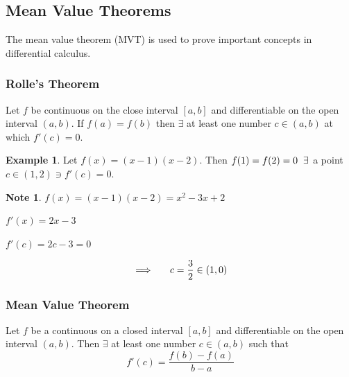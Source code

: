 \documentclass[11pt,a4paper]{article}
\theoremstyle{definition}
\newtheorem{exa}[thm]{Example}
\newtheorem*{note}{Note}
\begin{document}
\pagebreak
\subsection{Mean Value Theorems}
The mean value theorem (MVT) is used to prove important concepts in differential calculus.


\subsubsection{Rolle's Theorem}
Let $f$ be continuous on the close interval $[a,b]$ and differentiable on the open interval $(a,b)$. If $f(a) = f(b)$ then $\exists$ at least one number $c \in (a,b)$ at which $f'(c) = 0$.


\begin{figure}[H]
\centering
{}
\end{figure}

\begin{exa}


Let $f(x) = (x - 1)(x - 2)$. Then $f(1) = f(2) = 0 \hspace{0.2cm}\exists $ a point $c\in (1,2)\ni f'(c) = 0$.


\begin{note}
$f(x) = (x - 1) (x - 2) = x^2 - 3x + 2$
\end{note}


$f'(x)  = 2x - 3$


$f'(c)  = 2c - 3 = 0$

$$\implies\hspace{0.5cm} c = \frac{3}{2}\in (1,0)$$
\end{exa}


\subsubsection{Mean Value Theorem}
Let $f$ be a continuous on a closed interval $[a,b]$ and differentiable on the open interval $(a,b)$. Then $\exists$ at least one number $c\in (a,b)$ such that $$f'(c) = \frac{f(b) - f(a)}{b - a}$$
\end{document}

